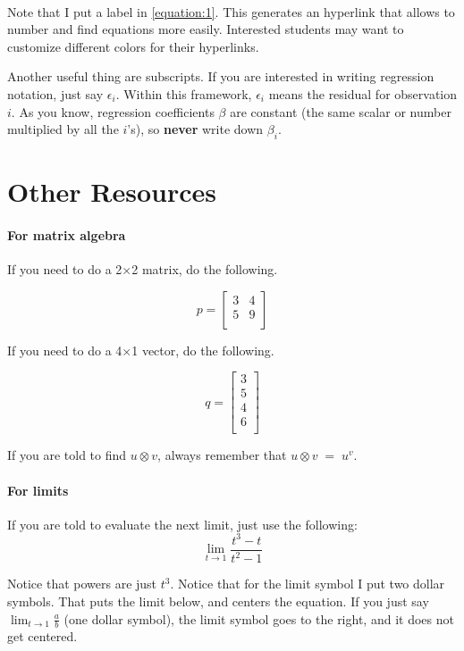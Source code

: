 \documentclass[11pt, oneside]{article}   	%
\begin{document}
\paragraph{}Note that I put a label in \autoref{equation:1}. This generates an hyperlink that allows to number and find equations more easily. Interested students may want to customize different colors for their hyperlinks. 

Another useful thing are subscripts. If you are interested in writing regression notation, just say $\epsilon_{i}$. Within this framework, $\epsilon_{i}$ means the residual for observation $i$. As you know, regression coefficients $\beta$ are constant (the same scalar or number multiplied by all the $i$'s), so {\bf never} write down $\beta_{i}$.

\section{Other Resources}

\paragraph{For matrix algebra}

If you need to do a 2$\times$2 matrix, do the following.

\[p=
\begin{bmatrix}
3 & 4\\
5 & 9\\ 
\end{bmatrix}
\]

If you need to do a 4$\times$1 vector, do the following.

\[q=
\begin{bmatrix}
3\\
5\\ 
4\\
6\\
\end{bmatrix}
\]


If you are told to find $u \otimes v$, always remember that $u \otimes v \;=\; u^{v}$.

\paragraph{For limits} 

If you are told to evaluate the next limit, just use the following: $$\lim_{t\to1}\frac{t^{3}-t}{t^{2}-1}$$


Notice that powers are just $t^{3}$. Notice that for the limit symbol I put two dollar symbols. That puts the limit below, and centers the equation. If you just say $\lim_{t\to1}\frac{a}{b}$ (one dollar symbol), the limit symbol goes to the right, and it does not get centered.
\end{document}
